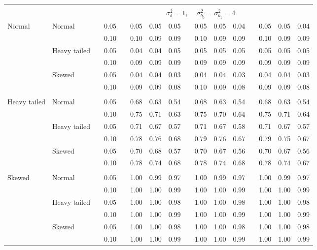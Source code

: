 \begin{table}[ht]
\begin{scriptsize}
\begin{center}
\begin{tabular}{ll p{.1cm} c p{.1cm} rrr p{.1cm} rrr p{.1cm} rrr}
&&&&&&&&&&&&&&&\\
& && && \multicolumn{9}{c}{$\sigma_{\varepsilon}^2 = 1$, \ \ $\sigma_{b_0}^2 = \sigma_{b_1}^2 = 4$} \\ \cline{6-16}

\rowcolor{gray!20} Normal       & Normal       && 0.05 &&  0.05 & 0.05 & 0.05 && 0.05 & 0.05 & 0.04 && 0.05 & 0.05 & 0.04 \\ 
\rowcolor{gray!20}             &              && 0.10 &&  0.10 & 0.09 & 0.09 && 0.10 & 0.09 & 0.09 && 0.10 & 0.09 & 0.09 \\ 
\rowcolor{gray!20}             & Heavy tailed && 0.05 &&  0.04 & 0.04 & 0.05 && 0.05 & 0.05 & 0.05 && 0.05 & 0.05 & 0.05 \\ 
\rowcolor{gray!20}             &              && 0.10 &&  0.09 & 0.09 & 0.09 && 0.09 & 0.09 & 0.09 && 0.09 & 0.09 & 0.09 \\ 
\rowcolor{gray!20}             & Skewed       && 0.05 &&  0.04 & 0.04 & 0.03 && 0.04 & 0.04 & 0.03 && 0.04 & 0.04 & 0.03 \\ 
\rowcolor{gray!20}             &              && 0.10 &&  0.09 & 0.09 & 0.08 && 0.10 & 0.09 & 0.08 && 0.09 & 0.09 & 0.08 \\ 
             &&&&&&&&&&&&&&&\\
Heavy tailed & Normal       && 0.05 &&  0.68 & 0.63 & 0.54 && 0.68 & 0.63 & 0.54 && 0.68 & 0.63 & 0.54 \\ 
             &              && 0.10 &&  0.75 & 0.71 & 0.63 && 0.75 & 0.70 & 0.64 && 0.75 & 0.71 & 0.64 \\ 
             & Heavy tailed && 0.05 &&  0.71 & 0.67 & 0.57 && 0.71 & 0.67 & 0.58 && 0.71 & 0.67 & 0.57 \\ 
             &              && 0.10 &&  0.78 & 0.76 & 0.68 && 0.79 & 0.76 & 0.67 && 0.79 & 0.75 & 0.67 \\ 
             & Skewed       && 0.05 &&  0.70 & 0.68 & 0.57 && 0.70 & 0.67 & 0.56 && 0.70 & 0.67 & 0.56 \\ 
             &              && 0.10 &&  0.78 & 0.74 & 0.68 && 0.78 & 0.74 & 0.68 && 0.78 & 0.74 & 0.67 \\ 
             &&&&&&&&&&&&&&&\\
Skewed       & Normal       && 0.05 &&  1.00 & 0.99 & 0.97 && 1.00 & 0.99 & 0.97 && 1.00 & 0.99 & 0.97 \\ 
             &              && 0.10 &&  1.00 & 1.00 & 0.99 && 1.00 & 1.00 & 0.99 && 1.00 & 1.00 & 0.99 \\ 
             & Heavy tailed && 0.05 &&  1.00 & 1.00 & 0.98 && 1.00 & 1.00 & 0.98 && 1.00 & 1.00 & 0.98 \\ 
             &              && 0.10 &&  1.00 & 1.00 & 0.99 && 1.00 & 1.00 & 0.99 && 1.00 & 1.00 & 0.99 \\ 
             & Skewed       && 0.05 &&  1.00 & 1.00 & 0.98 && 1.00 & 1.00 & 0.98 && 1.00 & 1.00 & 0.98 \\ 
             &              && 0.10 &&  1.00 & 1.00 & 0.99 && 1.00 & 1.00 & 0.99 && 1.00 & 1.00 & 0.99 \\ 



\end{tabular}
\end{center}
\end{scriptsize}
\end{table}
